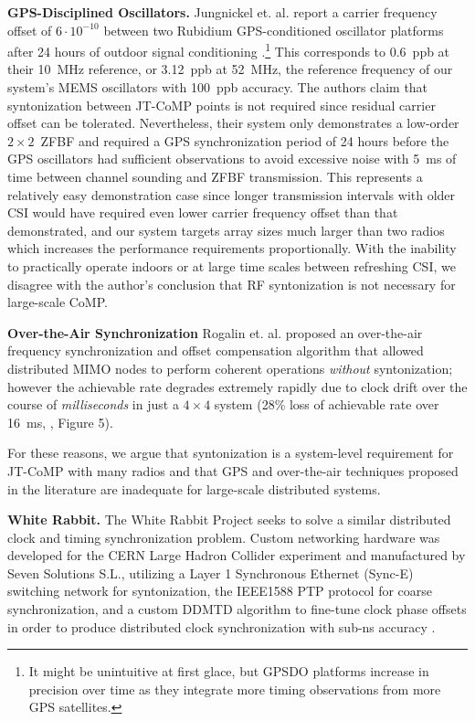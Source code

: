 \textbf{GPS-Disciplined Oscillators.}
	Jungnickel et. al. report a carrier frequency offset of $6\cdot10^{-10}$ between two Rubidium GPS-conditioned oscillator platforms after 24 hours of outdoor signal conditioning \cite{jungnickel2008synchronization}.\footnote{It might be unintuitive at first glace, but \ac{GPSDO} platforms increase in precision over time as they integrate more timing observations from more \ac{GPS} satellites.}
	This corresponds to 0.6~ppb at their 10~MHz reference, or 3.12~ppb at 52~MHz, the reference frequency of our system's \ac{MEMS} oscillators with 100~ppb accuracy.
	The authors claim that syntonization between \ac{JT}-\ac{CoMP} points is not required since residual carrier offset can be tolerated.
	Nevertheless, their system only demonstrates a low-order $2\times 2$~\ac{ZFBF} and required a \ac{GPS} synchronization period of 24 hours before the \ac{GPS} oscillators had sufficient observations to avoid excessive noise with 5~ms of time between channel sounding and \ac{ZFBF} transmission.
	This represents a relatively easy demonstration case since longer transmission intervals with older \ac{CSI} would have required even lower carrier frequency offset than that demonstrated, and our system targets array sizes much larger than two radios which increases the performance requirements proportionally.
	With the inability to practically operate indoors or at large time scales between refreshing \ac{CSI}, we disagree with the author's conclusion that RF syntonization is not necessary for large-scale \ac{CoMP}.
	
\textbf{Over-the-Air Synchronization}
 Rogalin et. al. proposed an over-the-air frequency synchronization and offset compensation algorithm that allowed distributed \ac{MIMO} nodes to perform coherent operations \emph{without} syntonization; however the achievable rate degrades extremely rapidly due to clock drift over the course of \emph{milliseconds} in just a $4\times 4$ system (28\% loss of achievable rate over 16~ms, \cite{rogalin2014scalable}, Figure 5).

	For these reasons, we argue that syntonization is a system-level requirement for \ac{JT}-\ac{CoMP} with many radios and that \ac{GPS} and over-the-air techniques proposed in the literature are inadequate for large-scale distributed systems.
	
\textbf{White Rabbit.}
	The White Rabbit Project seeks to solve a similar distributed clock and timing synchronization problem.
	Custom networking hardware was developed for the \ac{CERN} Large Hadron Collider experiment and manufactured by Seven Solutions S.L., \cite{lipinski2011white, serrano2013white} utilizing a Layer 1 Synchronous Ethernet (Sync-E) switching network \cite{rec2007g} for syntonization, the IEEE1588 \ac{PTP} protocol for coarse synchronization, and a custom \ac{DDMTD} algorithm to fine-tune clock phase offsets in order to produce distributed clock synchronization with sub-ns accuracy \cite{wlostowski2011precise}.

